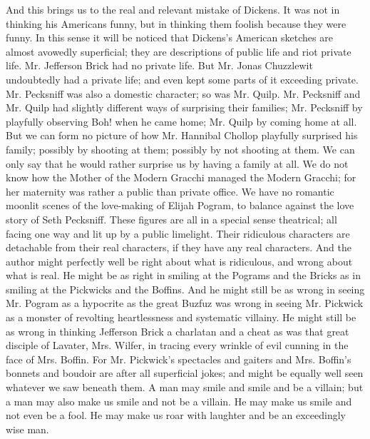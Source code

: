 \documentclass{book}
\begin{document}
And this brings us to the real and relevant mistake of Dickens. It was not in thinking his Americans funny, but in thinking them foolish because they were funny. In this sense it will be noticed that Dickens’s American sketches are almost avowedly superficial; they are descriptions of public life and riot private life. Mr. Jefferson Brick had no private life. But Mr. Jonas Chuzzlewit undoubtedly had a private life; and even kept some parts of it exceeding private. Mr. Pecksniff was also a domestic character; so was Mr. Quilp. Mr. Pecksniff and Mr. Quilp had slightly different ways of surprising their families; Mr. Pecksniff by playfully observing Boh! when he came home; Mr. Quilp by coming home at all. But we can form no picture of how Mr. Hannibal Chollop playfully surprised his family; possibly by shooting at them; possibly by not shooting at them. We can only say that he would rather surprise us by having a family at all. We do not know how the Mother of the Modern Gracchi managed the Modern Gracchi; for her maternity was rather a public than private office. We have no romantic moonlit scenes of the love-making of Elijah Pogram, to balance against the love story of Seth Pecksniff. These figures are all in a special sense theatrical; all facing one way and lit up by a public limelight. Their ridiculous characters are detachable from their real characters, if they have any real characters. And the author might perfectly well be right about what is ridiculous, and wrong about what is real. He might be as right in smiling at the Pograms and the Bricks as in smiling at the Pickwicks and the Boffins. And he might still be as wrong in seeing Mr. Pogram as a hypocrite as the great Buzfuz was wrong in seeing Mr. Pickwick as a monster of revolting heartlessness and systematic villainy. He might still be as wrong in thinking Jefferson Brick a charlatan and a cheat as was that great disciple of Lavater, Mrs. Wilfer, in tracing every wrinkle of evil cunning in the face of Mrs. Boffin. For Mr. Pickwick’s spectacles and gaiters and Mrs. Boffin’s bonnets and boudoir are after all superficial jokes; and might be equally well seen whatever we saw beneath them. A man may smile and smile and be a villain; but a man may also make us smile and not be a villain. He may make us smile and not even be a fool. He may make us roar with laughter and be an exceedingly wise man.
\end{document}
